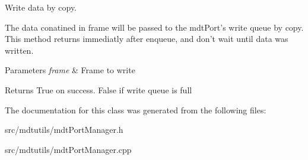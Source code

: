 Write data by copy. 

The data conatined in frame will be passed to the mdtPort's write queue by copy. This method returns immediatly after enqueue, and don't wait until data was written. 
\begin{DoxyParams}{Parameters}
{\em frame} & Frame to write \\
\hline
\end{DoxyParams}
\begin{DoxyReturn}{Returns}
True on success. False if write queue is full 
\end{DoxyReturn}


The documentation for this class was generated from the following files:\begin{DoxyCompactItemize}
\item 
src/mdtutils/mdtPortManager.h\item 
src/mdtutils/mdtPortManager.cpp\end{DoxyCompactItemize}
